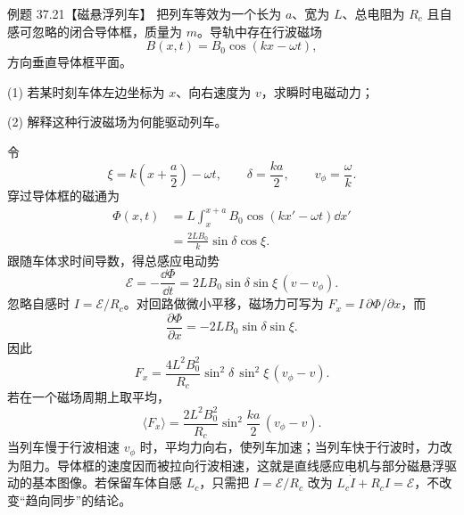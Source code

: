 \Needspace{0.12\textheight}
\begin{origexamplebox}{例题 37.21【磁悬浮列车】}
把列车等效为一个长为 $a$、宽为 $L$、总电阻为 $R_c$ 且自感可忽略的闭合导体框，质量为 $m$。导轨中存在行波磁场
\begin{equation*}
  B(x,t)=B_0\cos(kx-\omega t),
\end{equation*}
方向垂直导体框平面。

(1) 若某时刻车体左边坐标为 $x$、向右速度为 $v$，求瞬时电磁动力；

(2) 解释这种行波磁场为何能驱动列车。
\end{origexamplebox}

\begin{xesolution}
令
\begin{equation}
  \xi=k\left(x+\frac a2\right)-\omega t,
  \qquad
  \delta=\frac{ka}{2},
  \qquad
  v_\phi=\frac\omega k.
\end{equation}
穿过导体框的磁通为
\begin{align}
  \Phi(x,t)
  &=L\int_x^{x+a}B_0\cos(kx'-\omega t)\dd x'\\
  &=\frac{2LB_0}{k}\sin\delta\cos\xi.
\end{align}
跟随车体求时间导数，得总感应电动势
\begin{equation}
  \mathcal E=-\frac{\dd\Phi}{\dd t}
  =2LB_0\sin\delta\sin\xi\,(v-v_\phi).
\end{equation}
忽略自感时 $I=\mathcal E/R_c$。对回路做微小平移，磁场力可写为 $F_x=I\,\partial\Phi/\partial x$，而
\begin{equation}
  \frac{\partial\Phi}{\partial x}=-2LB_0\sin\delta\sin\xi.
\end{equation}
因此
\begin{equation}
  \boxed{F_x=\frac{4L^2B_0^2}{R_c}\sin^2\!\delta\,\sin^2\!\xi\,(v_\phi-v)}.
\end{equation}
若在一个磁场周期上取平均，
\begin{equation}
  \boxed{\langle F_x\rangle=\frac{2L^2B_0^2}{R_c}
  \sin^2\!\frac{ka}{2}\,(v_\phi-v)}.
\end{equation}
当列车慢于行波相速 $v_\phi$ 时，平均力向右，使列车加速；当列车快于行波时，力改为阻力。导体框的速度因而被拉向行波相速，这就是直线感应电机与部分磁悬浮驱动的基本图像。若保留车体自感 $L_c$，只需把 $I=\mathcal E/R_c$ 改为 $L_c\dot I+R_cI=\mathcal E$，不改变“趋向同步”的结论。

\travelingFieldTrainDiagram
\end{xesolution}
